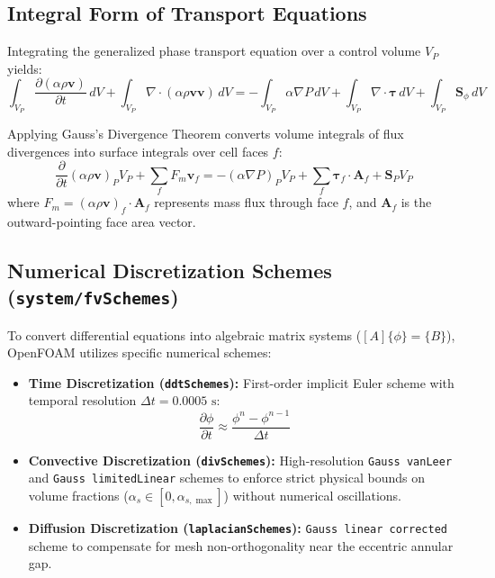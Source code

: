 \documentclass[12pt,a4paper]{article}
\begin{document}
\subsection{Integral Form of Transport Equations}
Integrating the generalized phase transport equation over a control volume $V_P$ yields:
\begin{equation}
\int_{V_P} \frac{\partial (\alpha \rho \mathbf{v})}{\partial t} \, dV + \int_{V_P} \nabla \cdot (\alpha \rho \mathbf{v} \mathbf{v}) \, dV = -\int_{V_P} \alpha \nabla P \, dV + \int_{V_P} \nabla \cdot \boldsymbol{\tau} \, dV + \int_{V_P} \mathbf{S}_\phi \, dV
\end{equation}

Applying Gauss's Divergence Theorem converts volume integrals of flux divergences into surface integrals over cell faces $f$:
\begin{equation}
\frac{\partial}{\partial t}(\alpha \rho \mathbf{v})_P V_P + \sum_{f} F_m \mathbf{v}_f = -(\alpha \nabla P)_P V_P + \sum_{f} \boldsymbol{\tau}_f \cdot \mathbf{A}_f + \mathbf{S}_P V_P
\end{equation}
where $F_m = (\alpha \rho \mathbf{v})_f \cdot \mathbf{A}_f$ represents mass flux through face $f$, and $\mathbf{A}_f$ is the outward-pointing face area vector.

\subsection{Numerical Discretization Schemes (\texttt{system/fvSchemes})}
To convert differential equations into algebraic matrix systems ($[A]\{\phi\} = \{B\}$), OpenFOAM utilizes specific numerical schemes:
\begin{itemize}
    \item \textbf{Time Discretization (\texttt{ddtSchemes}):} First-order implicit Euler scheme with temporal resolution $\Delta t = 0.0005\text{ s}$:
    \begin{equation}
    \frac{\partial \phi}{\partial t} \approx \frac{\phi^n - \phi^{n-1}}{\Delta t}
    \end{equation}
    \item \textbf{Convective Discretization (\texttt{divSchemes}):} High-resolution \texttt{Gauss vanLeer} and \texttt{Gauss limitedLinear} schemes to enforce strict physical bounds on volume fractions ($\alpha_s \in [0, \alpha_{s,\max}]$) without numerical oscillations.
    \item \textbf{Diffusion Discretization (\texttt{laplacianSchemes}):} \texttt{Gauss linear corrected} scheme to compensate for mesh non-orthogonality near the eccentric annular gap.
\end{itemize}
\end{document}
